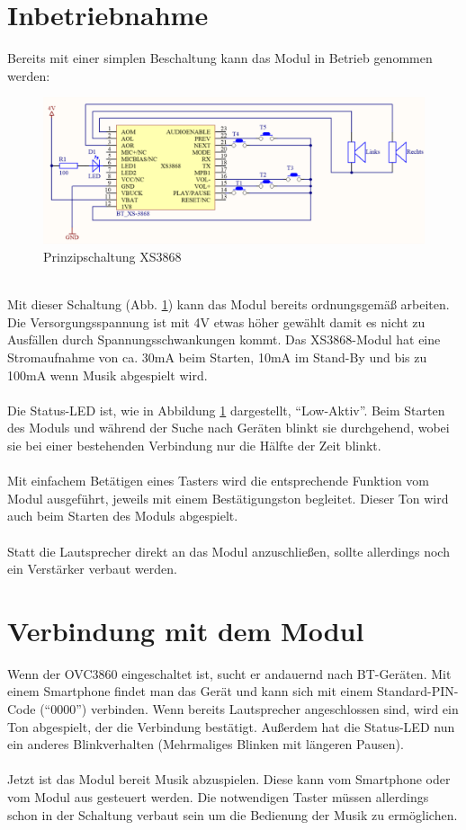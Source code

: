 \section{Inbetriebnahme}
Bereits mit einer simplen Beschaltung kann das Modul in Betrieb genommen werden:
\begin{figure} [h]
	\centering
	\caption{Prinzipschaltung XS3868}
	\label {fig:abb2.3}
	\includegraphics[width=1\textwidth]{schaltungen/XS3868_Prinzipschaltung.png}
\end{figure} \\
Mit dieser Schaltung (Abb. \ref {fig:abb2.3}) kann das Modul bereits ordnungsgemäß arbeiten.\\
Die Versorgungsspannung ist mit 4V etwas höher gewählt damit es nicht zu Ausfällen durch Spannungsschwankungen kommt. Das XS3868-Modul hat eine Stromaufnahme von ca. 30mA beim Starten, 10mA im Stand-By und bis zu 100mA wenn Musik abgespielt wird.\\ \\
Die Status-LED ist, wie in Abbildung \ref {fig:abb2.3} dargestellt, \enquote{Low-Aktiv}. Beim Starten des Moduls und während der Suche nach Geräten blinkt sie durchgehend, wobei sie bei einer bestehenden Verbindung nur die Hälfte der Zeit blinkt.\\ \\
Mit einfachem Betätigen eines Tasters wird die entsprechende Funktion vom Modul ausgeführt, jeweils mit einem Bestätigungston begleitet. Dieser Ton wird auch beim Starten des Moduls abgespielt.\\ \\
Statt die Lautsprecher direkt an das Modul anzuschließen, sollte allerdings noch ein Verstärker verbaut werden.
\newpage


\section{Verbindung mit dem Modul}
Wenn der OVC3860 eingeschaltet ist, sucht er andauernd nach BT-Geräten. Mit einem Smartphone findet man das Gerät und kann sich mit einem Standard-PIN-Code (\enquote{0000}) verbinden. Wenn bereits Lautsprecher angeschlossen sind, wird ein Ton abgespielt, der die Verbindung bestätigt. Außerdem hat die Status-LED nun ein anderes Blinkverhalten (Mehrmaliges Blinken mit längeren Pausen).\\ \\
Jetzt ist das Modul bereit Musik abzuspielen. Diese kann vom Smartphone oder vom Modul aus gesteuert werden. Die notwendigen Taster müssen allerdings schon in der Schaltung verbaut sein um die Bedienung der Musik zu ermöglichen.


